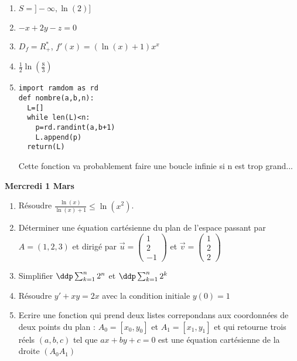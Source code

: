 \documentclass[a4paper, 11pt,reqno]{article}
\newcommand\vv[1]{\overrightarrow{#1}}
\begin{document}
\begin{correction}
\begin{enumerate}
\item $S=]-\infty,\ln(2)]$
\item $-x+2y-z=0$
\item $D_f=R_+^*$, $f'(x)= (\ln(x)+1)x^x$
\item $\frac{1}{2} \ln(\frac{8}{3})$
\item 

\begin{lstlisting}
import ramdom as rd
def nombre(a,b,n):
  L=[]
  while len(L)<n:
    p=rd.randint(a,b+1)
    L.append(p)
  return(L)
\end{lstlisting}
Cette fonction va probablement faire une boucle infinie si n est trop grand... 

\end{enumerate}
\end{correction}

\newpage
\begin{center}
\textbf{Mercredi 1  Mars}
\end{center}
\begin{enumerate}
\item Résoudre $\frac{\ln(x)}{\ln(x)+1}\leq \ln{(x^2)}$.
\item Déterminer  une équation cartésienne du plan de l'espace passant par $A=(1,2,3)$ et dirigé par $\vv{u} =\begin{pmatrix}
1\\2\\-1
\end{pmatrix}$ et $\vv{v} =\begin{pmatrix}
1\\2\\2
\end{pmatrix}$ 
\item Simplifier $\ddp \sum_{k=1}^n 2^n$ et $\ddp \sum_{k=1}^n 2^k$
\item Résoudre $y'+xy=2x$ avec la condition initiale $y(0)=1$
\item Ecrire une fonction qui prend deux listes correpondans aux  coordonnées de deux points du plan : $A_0=[x_0, y_0]$ et $A_1=[x_1, y_1]$ et qui retourne trois réels $(a,b,c)$ tel que $ax+by+c=0$ est une équation cartésienne de la droite $(A_0A_1)$
\end{enumerate}
\end{document}

